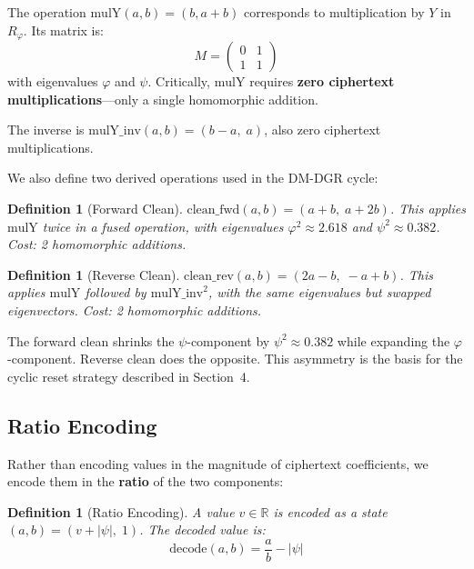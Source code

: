 \documentclass[11pt,a4paper]{article}
\newtheorem{definition}[theorem]{Definition}
\begin{document}
The operation $\text{mulY}(a,b) = (b, a+b)$ corresponds to multiplication by $Y$ in $R_\varphi$. Its matrix is:
\begin{equation}
M = \begin{pmatrix}0 & 1 \\ 1 & 1\end{pmatrix}
\end{equation}
with eigenvalues $\varphi$ and $\psi$. Critically, $\text{mulY}$ requires \textbf{zero ciphertext multiplications}---only a single homomorphic addition.

The inverse is $\text{mulY\_inv}(a,b) = (b-a,\; a)$, also zero ciphertext multiplications.

We also define two derived operations used in the DM-DGR cycle:

\begin{definition}[Forward Clean]
$\text{clean\_fwd}(a,b) = (a+b,\; a+2b)$. This applies $\text{mulY}$ twice in a fused operation, with eigenvalues $\varphi^2 \approx 2.618$ and $\psi^2 \approx 0.382$. Cost: 2 homomorphic additions.
\end{definition}

\begin{definition}[Reverse Clean]
$\text{clean\_rev}(a,b) = (2a-b,\; -a+b)$. This applies $\text{mulY}$ followed by $\text{mulY\_inv}^2$, with the same eigenvalues but swapped eigenvectors. Cost: 2 homomorphic additions.
\end{definition}

The forward clean shrinks the $\psi$-component by $\psi^2 \approx 0.382$ while expanding the $\varphi$-component. Reverse clean does the opposite. This asymmetry is the basis for the cyclic reset strategy described in Section~4.

\subsection{Ratio Encoding}

Rather than encoding values in the magnitude of ciphertext coefficients, we encode them in the \textbf{ratio} of the two components:

\begin{definition}[Ratio Encoding]
A value $v \in \mathbb{R}$ is encoded as a state $(a,b) = (v + |\psi|,\; 1)$. The decoded value is:
\begin{equation}
\text{decode}(a,b) = \frac{a}{b} - |\psi|
\end{equation}
\end{definition}
\end{document}
